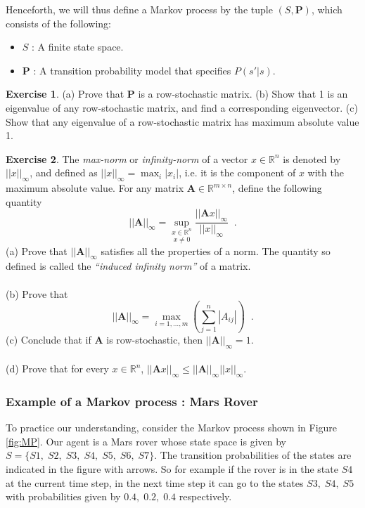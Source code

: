\documentclass{article}
\theoremstyle{definition}
\newtheorem{exercise}{Exercise}[section]
\theoremstyle{remark}
\begin{document}
Henceforth, we will thus define a Markov process by the tuple $(S,\mathbf{P})$, which consists of the following:
\begin{itemize}
\item $S$ : A finite state space.
\item $\mathbf{P}$ : A transition probability model that specifies $P(s'|s)$.
\end{itemize}

\begin{exercise}
(a) Prove that $\mathbf{P}$ is a row-stochastic matrix. (b) Show that 1 is an eigenvalue of any row-stochastic matrix, and find a corresponding eigenvector. (c) Show that any eigenvalue of a row-stochastic matrix has maximum absolute value 1.
\label{ex-Pstochastic}
\end{exercise}

\begin{exercise}
The \textit{max-norm} or \textit{infinity-norm} of a vector $x \in \mathbb{R}^{n}$ is denoted by $||x||_{\infty}$, and defined as $||x||_{\infty} = \max_i |x_i|$, i.e. it is the component of $x$ with the maximum absolute value. For any matrix $\mathbf{A} \in \mathbb{R}^{m \times n}$, define the following quantity 
\begin{equation}
||\mathbf{A}||_{\infty} = \underset{x \neq 0}{\underset{x \in \mathbb{R}^n}{\sup}}\frac{||\mathbf{A}x||_{\infty}}{||x||_{\infty}} \;\; .
\label{eq:induced-max-norm}
\end{equation}
(a) Prove that $||\mathbf{A}||_{\infty}$ satisfies all the properties of a norm. The quantity so defined is called the \textit{``induced infinity norm''} of a matrix.\\
\\
(b) Prove that
\begin{equation}
||\mathbf{A}||_{\infty} = \underset{i = 1,\dots,m}{\max} \left(\sum_{j=1}^{n}|A_{ij}| \right) \;\;.
\label{eq:induced-max-norm1}
\end{equation}
(c) Conclude that if $\mathbf{A}$ is row-stochastic, then $||\mathbf{A}||_{\infty} = 1$.\\
\\
(d) Prove that for every $x \in \mathbb{R}^{n}$, $||\mathbf{A}x||_{\infty} \leq ||\mathbf{A}||_{\infty}||x||_{\infty}$.
\label{ex-Pstochastic-norm}\\
\end{exercise}

\subsubsection{Example of a Markov process : Mars Rover}
\label{MP-example-subsubsection}
To practice our understanding, consider the Markov process shown in Figure \ref{fig:MP}. Our agent is a Mars rover whose state space is given by $S = \{S1,\;S2,\;S3,\;S4,\;S5,\;S6,\;S7\}$. The transition probabilities of the states are indicated in the figure with arrows. So for example if the rover is in the state $S4$ at the current time step, in the next time step it can go to the states $S3,\;S4,\;S5$ with probabilities given by $0.4,\;0.2,\;0.4$ respectively.
\end{document}

